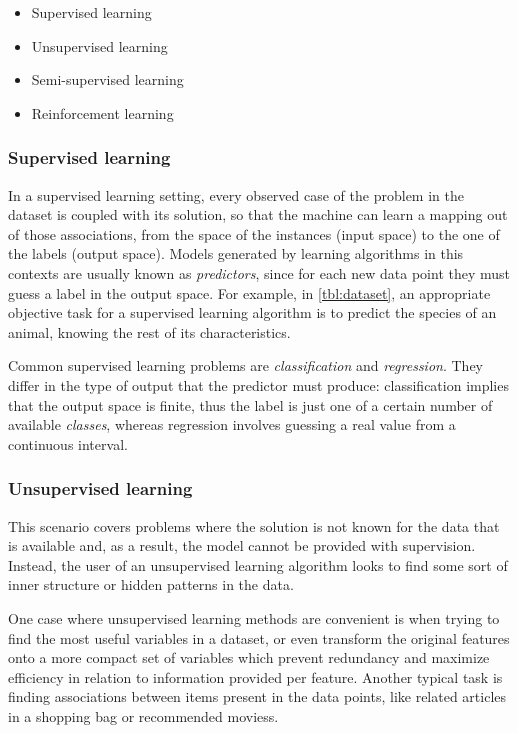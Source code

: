 \begin{itemize}
    \item Supervised learning %
    \item Unsupervised learning
    \item Semi-supervised learning
    \item Reinforcement learning
\end{itemize}

\subsubsection{Supervised learning}

In a supervised learning setting, every observed case of the problem in the dataset is coupled with its solution, so that the machine can learn a mapping out of those associations, from the space of the instances (input space) to the one of the labels (output space). Models generated by learning algorithms in this contexts are usually known as \textit{predictors}, since for each new data point they must guess a label in the output space. For example, in \autoref{tbl:dataset}, an appropriate objective task for a supervised learning algorithm is to predict the species of an animal, knowing the rest of its characteristics. 

Common supervised learning problems are \textit{classification} and \textit{regression}. They differ in the type of output that the predictor must produce: classification implies that the output space is finite, thus the label is just one of a certain number of available \textit{classes}, whereas regression involves guessing a real value from a continuous interval. 

\subsubsection{Unsupervised learning}

This scenario covers problems where the solution is not known for the data that is available and, as a result, the model cannot be provided with supervision. Instead, the user of an unsupervised learning algorithm looks to find some sort of inner structure or hidden patterns in the data.

One case where unsupervised learning methods are convenient is when trying to find the most useful variables in a dataset, or even transform the original features onto a more compact set of variables which prevent redundancy and maximize efficiency in relation to information provided per feature. Another typical task is finding associations between items present in the data points, like related articles in a shopping bag or recommended moviess. 


